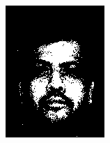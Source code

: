\begin{figure}[h]
\begin{subfigure}[b]{0.18\textwidth}
         \includegraphics[width=\textwidth]{images/results/base_st/dd109.color.d3_dyc.png}
     \end{subfigure}
     \begin{subfigure}[b]{0.18\textwidth}
         \centering

\end{subfigure}
\end{figure}
